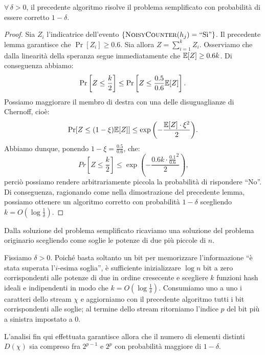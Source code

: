 \begin{lemma}
  \(\forall\,\delta>0\), il precedente algoritmo risolve il problema
  semplificato con probabilit\`a di essere corretto \(1-\delta\).
\end{lemma}
\begin{proof}
  Sia \(Z_i\) l'indicatrice dell'evento \(\{\textsc{NoisyCounter}(h_j)=\mbox{``S\`i''}\}\).
  Il precedente lemma garantisce che \(\Pr[Z_i]\ge 0.6\). Sia allora \(Z=
  \sum_{i=1}^k{Z_i}\). Osserviamo che dalla linearit\`a della speranza segue 
  immediatamente che \(\mathbb{E}[Z]\ge 0.6k\). Di conseguenza abbiamo:
  \[\Pr\left[Z\le\frac{k}{2}\right]\le\Pr\left[Z\le\frac{0.5}{0.6}
  \mathbb{E}[Z]\right]\mbox{.}\]
  Possiamo maggiorare il membro di destra con una delle disuguaglianze di
  Chernoff, cio\`e:
  \[\mbox{Pr}[Z\le(1-\xi)\mathbb{E}[Z]]\le\exp{\left(-\frac{\mathbb{E}[Z]\cdot\xi^2}{2}
  \right)}\mbox{.}\] Abbiamo dunque, ponendo \(1-\xi = \frac{0.5}{0.6}\), che:
  \[Pr\left[Z\le\frac{k}{2}\right]\le\exp{\left(-\frac{0.6 
  k\cdot{\frac{0.1}{0.6}}^2}{2}\right)}\mbox{,}\] perci\`o possiamo rendere 
  arbitrariamente  piccola la probabilit\`a di rispondere ``No''. Di conseguenza, 
  ragionando come nella dimostrazione del precedente lemma, possiamo ottenere un 
  algoritmo corretto con probabilit\`a \(1-\delta\) scegliendo \(k = 
  O\left(\log{\frac{1}{\delta}}\right)\).
\end{proof}

Dalla soluzione del problema semplificato ricaviamo una soluzione del problema
originario scegliendo come soglie le potenze di due pi\`u piccole di \(n\). 

Fissiamo \(\delta > 0\). Poich\'e basta soltanto un bit per memorizzare 
l'informazione ``\`e stata superata l'\(i\)-esima soglia'', \`e sufficiente 
inizializzare \(\log{n}\) bit a zero corrispondenti alle potenze di due in ordine
cresecente e scegliere \(k\) funzioni hash ideali e indipendenti in modo che \(k 
= O\left(\log{\frac{1}{\delta}}\right)\). Consumiamo uno a uno i caratteri dello 
stream \(\chi\) e aggiorniamo con il precedente algoritmo tutti i bit 
corrispondenti alle soglie; al termine dello stream ritorniamo l'indice \(p\) del 
bit pi\`u a sinistra impostato a \(0\).

L'analisi fin qui effettuata garantisce allora che il numero di elementi distinti 
\(D(\chi)\) sia compreso fra \(2^{p-1}\) e \(2^p\) con probabilit\`a maggiore di
\(1-\delta\).

